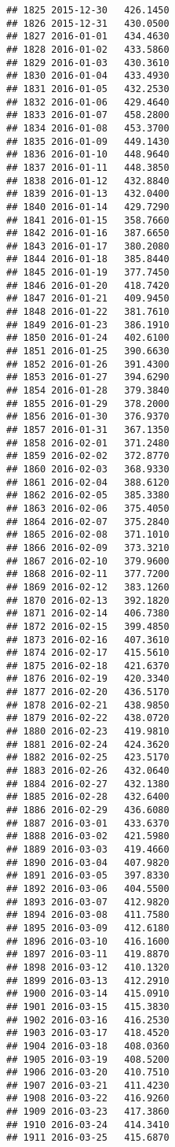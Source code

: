 \documentclass[
]{article}
\begin{document}
\begin{verbatim}
## 1825 2015-12-30   426.1450
## 1826 2015-12-31   430.0500
## 1827 2016-01-01   434.4630
## 1828 2016-01-02   433.5860
## 1829 2016-01-03   430.3610
## 1830 2016-01-04   433.4930
## 1831 2016-01-05   432.2530
## 1832 2016-01-06   429.4640
## 1833 2016-01-07   458.2800
## 1834 2016-01-08   453.3700
## 1835 2016-01-09   449.1430
## 1836 2016-01-10   448.9640
## 1837 2016-01-11   448.3850
## 1838 2016-01-12   432.8840
## 1839 2016-01-13   432.0400
## 1840 2016-01-14   429.7290
## 1841 2016-01-15   358.7660
## 1842 2016-01-16   387.6650
## 1843 2016-01-17   380.2080
## 1844 2016-01-18   385.8440
## 1845 2016-01-19   377.7450
## 1846 2016-01-20   418.7420
## 1847 2016-01-21   409.9450
## 1848 2016-01-22   381.7610
## 1849 2016-01-23   386.1910
## 1850 2016-01-24   402.6100
## 1851 2016-01-25   390.6630
## 1852 2016-01-26   391.4300
## 1853 2016-01-27   394.6290
## 1854 2016-01-28   379.3840
## 1855 2016-01-29   378.2000
## 1856 2016-01-30   376.9370
## 1857 2016-01-31   367.1350
## 1858 2016-02-01   371.2480
## 1859 2016-02-02   372.8770
## 1860 2016-02-03   368.9330
## 1861 2016-02-04   388.6120
## 1862 2016-02-05   385.3380
## 1863 2016-02-06   375.4050
## 1864 2016-02-07   375.2840
## 1865 2016-02-08   371.1010
## 1866 2016-02-09   373.3210
## 1867 2016-02-10   379.9600
## 1868 2016-02-11   377.7200
## 1869 2016-02-12   383.1260
## 1870 2016-02-13   392.1820
## 1871 2016-02-14   406.7380
## 1872 2016-02-15   399.4850
## 1873 2016-02-16   407.3610
## 1874 2016-02-17   415.5610
## 1875 2016-02-18   421.6370
## 1876 2016-02-19   420.3340
## 1877 2016-02-20   436.5170
## 1878 2016-02-21   438.9850
## 1879 2016-02-22   438.0720
## 1880 2016-02-23   419.9810
## 1881 2016-02-24   424.3620
## 1882 2016-02-25   423.5170
## 1883 2016-02-26   432.0640
## 1884 2016-02-27   432.1380
## 1885 2016-02-28   432.6400
## 1886 2016-02-29   436.6080
## 1887 2016-03-01   433.6370
## 1888 2016-03-02   421.5980
## 1889 2016-03-03   419.4660
## 1890 2016-03-04   407.9820
## 1891 2016-03-05   397.8330
## 1892 2016-03-06   404.5500
## 1893 2016-03-07   412.9820
## 1894 2016-03-08   411.7580
## 1895 2016-03-09   412.6180
## 1896 2016-03-10   416.1600
## 1897 2016-03-11   419.8870
## 1898 2016-03-12   410.1320
## 1899 2016-03-13   412.2910
## 1900 2016-03-14   415.0910
## 1901 2016-03-15   415.3830
## 1902 2016-03-16   416.2530
## 1903 2016-03-17   418.4520
## 1904 2016-03-18   408.0360
## 1905 2016-03-19   408.5200
## 1906 2016-03-20   410.7510
## 1907 2016-03-21   411.4230
## 1908 2016-03-22   416.9260
## 1909 2016-03-23   417.3860
## 1910 2016-03-24   414.3410
## 1911 2016-03-25   415.6870

\end{verbatim}
\end{document}

